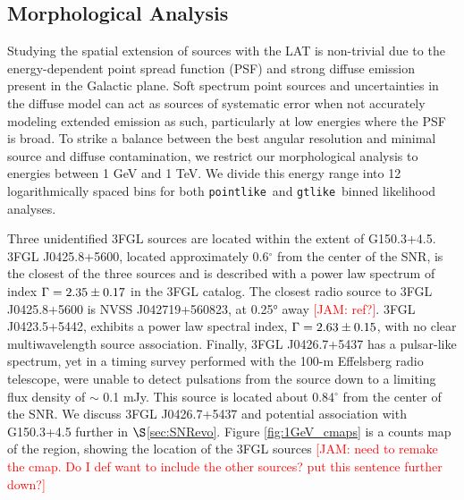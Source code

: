 \documentclass[iop]{emulateapj}
\newcommand{\kibitz}[2]{\ifnum\Comments=1\textcolor{#1}{#2}\fi}
\newcommand{\jamie}[1]{\kibitz{red}      {[JAM: #1]}}
\newcommand{\ptlike}{{\tt pointlike}}
\newcommand{\gtlike}{{\tt gtlike}}
\newcommand{\Gone}{G150.3+4.5}
\newcommand{\psrLike}{3FGL J0426.7+5437}
\begin{document}
\subsection{Morphological Analysis}\label{sec:LATmorph}
Studying the spatial extension of sources with the LAT is non-trivial due to the energy-dependent point spread function (PSF) and strong diffuse emission present in the Galactic plane. Soft spectrum point sources and uncertainties in the diffuse model can act as sources of systematic error when not accurately modeling extended emission as such, particularly at low energies where the PSF is broad. To strike a balance between the best angular resolution and minimal source and diffuse contamination, we restrict our morphological analysis to energies between 1 GeV and 1 TeV. We divide this energy range into 12 logarithmically spaced bins for both \ptlike~and \gtlike~binned likelihood analyses. 

Three  unidentified 3FGL sources are located within the extent of \Gone. 3FGL J0425.8+5600, located approximately 0.6$^\circ$ from the center of the SNR, is the closest of the three sources and is described with a power law spectrum of index ${\rm \Gamma = 2.35\pm 0.17}$  in the 3FGL catalog. The closest radio source to 3FGL J0425.8+5600 is NVSS J042719+560823, at 0.25° away \jamie{ref?}. 3FGL J0423.5+5442, exhibits a power law spectral index, ${\rm \Gamma = 2.63\pm 0.15}$, with no clear multiwavelength source association. Finally, \psrLike{} has a pulsar-like spectrum, yet in a timing survey performed with the 100-m  Effelsberg radio telescope, \cite{Barr13} were unable to detect pulsations from the source down to a limiting flux density of $\sim$ 0.1 mJy. This source is located about 0.84$^{\circ}$ from the center of the SNR. We discuss \psrLike{} and potential association with \Gone{} further in $\S$\ref{sec:SNRevo}. Figure \ref{fig:1GeV_cmaps} is a counts map of the region, showing the location of the 3FGL sources \jamie{need to remake the cmap. Do I def want to include the other sources? put this sentence further down?}
\end{document}
